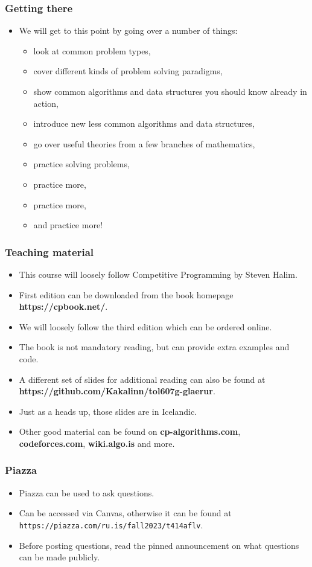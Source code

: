 \documentclass{beamer}
\begin{document}
\begin{frame}[plain]
	\frametitle{Getting there}
	\begin{itemize}
		 \item We will get to this point by going over a number of things:
		 \begin{itemize}
		 	\item look at common problem types,
		 	\item cover different kinds of problem solving paradigms,
		 	\item show common algorithms and data structures you should know already in action,
		 	\item introduce new less common algorithms and data structures,
		 	\item go over useful theories from a few branches of mathematics,
		 	\item practice solving problems,
		 	\item practice more,
		 	\item practice more,
		 	\item and practice more!
		 \end{itemize}
	\end{itemize}
\end{frame}

\begin{frame}[plain]
	\frametitle{Teaching material}
	\begin{itemize}
		 \item This course will loosely follow \alert{Competitive Programming} by Steven Halim.
		 \item First edition can be downloaded from the book homepage \textbf{https://cpbook.net/}.
		 \item We will loosely follow the third edition which can be ordered online.
		 \item The book is not mandatory reading, but can provide extra examples and code.
		 \item A different set of slides for additional reading can also be found at \textbf{https://github.com/Kakalinn/tol607g-glaerur}.
		 \item Just as a heads up, those slides are in Icelandic.
         \item Other good material can be found on \textbf{cp-algorithms.com}, \textbf{codeforces.com}, \textbf{wiki.algo.is} and more.
     \end{itemize}
\end{frame}

\begin{frame}[plain]
	\frametitle{Piazza}
	\begin{itemize}
		\item Piazza can be used to ask questions.
        \item Can be accessed via Canvas, otherwise it can be found at \texttt{https://piazza.com/ru.is/fall2023/t414aflv}.
        \item Before posting questions, read the pinned announcement on what questions can be made publicly.
	\end{itemize}
\end{frame}
\end{document}
